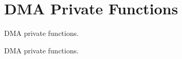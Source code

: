 \hypertarget{group___d_m_a___private___functions}{\section{D\-M\-A Private Functions}
\label{group___d_m_a___private___functions}
}


D\-M\-A private functions.  


D\-M\-A private functions. 